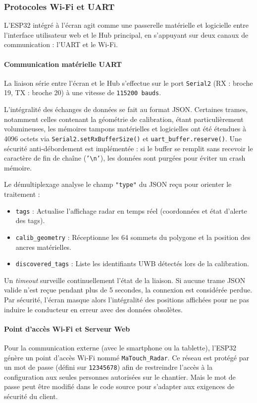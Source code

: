 \newpage
\subsubsection{Protocoles Wi-Fi et UART}

L'ESP32 intégré à l'écran agit comme une passerelle matérielle et logicielle entre l'interface utilisateur web et le Hub principal, en s'appuyant sur deux canaux de communication : l'UART et le Wi-Fi.

\paragraph{Communication matérielle UART}
La liaison série entre l'écran et le Hub s'effectue sur le port \texttt{Serial2} (RX : broche 19, TX : broche 20) à une vitesse de \texttt{115200 bauds}. 

L'intégralité des échanges de données se fait au format JSON. Certaines trames, notamment celles contenant la géométrie de calibration, étant particulièrement volumineuses, les mémoires tampons matérielles et logicielles ont été étendues à 4096 octets via \texttt{Serial2.setRxBufferSize()} et \texttt{uart\_buffer.reserve()}. Une sécurité anti-débordement est implémentée : si le buffer se remplit sans recevoir le caractère de fin de chaîne (\texttt{'\textbackslash n'}), les données sont purgées pour éviter un crash mémoire.

Le démultiplexage analyse le champ \texttt{"type"} du JSON reçu pour orienter le traitement :
\begin{itemize}
    \item \texttt{tags} : Actualise l'affichage radar en temps réel (coordonnées et état d'alerte des tags).
    \item \texttt{calib\_geometry} : Réceptionne les 64 sommets du polygone et la position des ancres matérielles.
    \item \texttt{discovered\_tags} : Liste les identifiants UWB détectés lors de la calibration.
\end{itemize}

Un \textit{timeout} surveille continuellement l'état de la liaison. Si aucune trame JSON valide n'est reçue pendant plus de 5 secondes, la connexion est considérée perdue. Par sécurité, l'écran masque alors l'intégralité des positions affichées pour ne pas induire le conducteur en erreur avec des données obsolètes.

\paragraph{Point d'accès Wi-Fi et Serveur Web}
Pour la communication externe (avec le smartphone ou la tablette), l'ESP32 génère un point d'accès Wi-Fi nommé \texttt{MaTouch\_Radar}. Ce réseau est protégé par un mot de passe (défini sur \texttt{12345678}) afin de restreindre l'accès à la configuration aux seules personnes autorisées sur le chantier. Mais le mot de passe peut être modifié dans le code source pour s'adapter aux exigences de sécurité du client.

